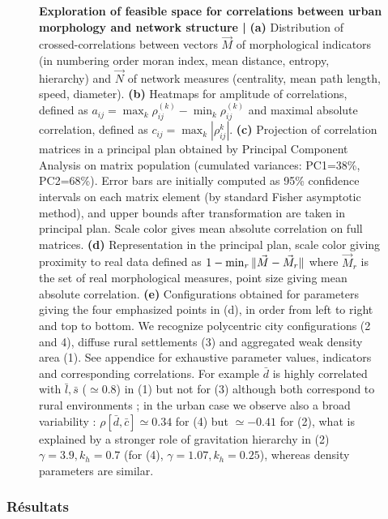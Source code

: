 \begin{figure}
\caption{\small\textbf{Exploration of feasible space for correlations between urban morphology and network structure | } \textbf{(a)} Distribution of crossed-correlations between vectors $\vec{M}$ of morphological indicators (in numbering order moran index, mean distance, entropy, hierarchy) and $\vec{N}$ of network measures (centrality, mean path length, speed, diameter). \textbf{(b)} Heatmaps for amplitude of correlations, defined as $a_{ij}=\max_k{\rho_{ij}^{(k)}}-\min_k{\rho_{ij}^{(k)}}$ and maximal absolute correlation, defined as $c_{ij}=\max_k\left| \rho_{ij}^{k} \right|$. \textbf{(c)} Projection of correlation matrices in a principal plan obtained by Principal Component Analysis on matrix population (cumulated variances: PC1=38\%, PC2=68\%). Error bars are initially computed as 95\% confidence intervals on each matrix element (by standard Fisher asymptotic method), and upper bounds after transformation are taken in principal plan. Scale color gives mean absolute correlation on full matrices. \textbf{(d)} Representation in the principal plan, scale color giving proximity to real data defined as $1 - \min_r \| \vec{M}-\vec{M}_r \|$ where $\vec{M}_r$ is the set of real morphological measures, point size giving mean absolute correlation. \textbf{(e)} Configurations obtained for parameters giving the four emphasized points in (d), in order from left to right and top to bottom. We recognize polycentric city configurations (2 and 4), diffuse rural settlements (3) and aggregated weak density area (1). See appendice for exhaustive parameter values, indicators and corresponding correlations. For example $\bar{d}$ is highly correlated with $\bar{l},\bar{s}$ ($\simeq$0.8) in (1) but not for (3) although both correspond to rural environments ; in the urban case we observe also a broad variability : $\rho[\bar{d},\bar{c}]\simeq 0.34$ for (4) but $\simeq-0.41$ for (2), what is explained by a stronger role of gravitation hierarchy in (2) $\gamma=3.9,k_h=0.7$ (for (4), $\gamma=1.07,k_h=0.25$), whereas density parameters are similar.}
\label{fig:densnwcor}
\end{figure}






\subsubsection{Résultats}

